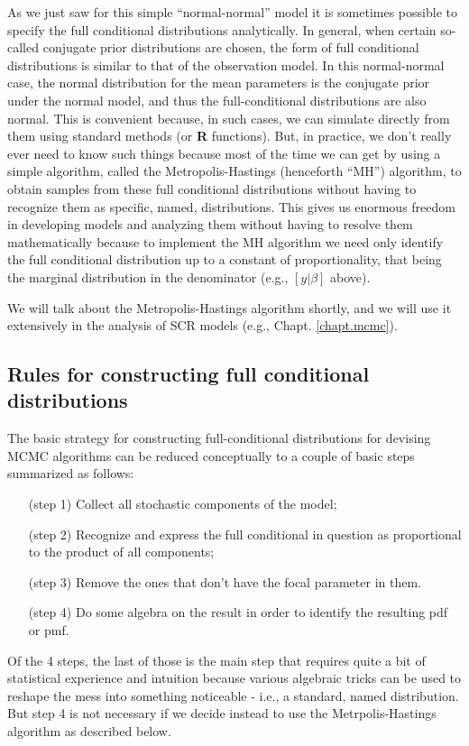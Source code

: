 \vspace{.1in}

As we just saw for this simple ``normal-normal'' model it is sometimes
possible to specify the full conditional distributions
analytically. In general, when certain so-called conjugate prior
distributions are chosen, the form of full conditional distributions
is similar to that of the observation model. In this normal-normal
case, the normal distribution for the mean parameters is the conjugate
prior under the normal model, and thus the full-conditional
distributions are also normal. This is convenient because, in such
cases, we can simulate directly from them using standard methods (or
{\bf R}
functions).  But, in practice, we don't really ever need to know such
things because most of the time we can get by using a simple
algorithm, called the Metropolis-Hastings (henceforth ``MH'')
algorithm, to obtain samples from these full conditional distributions
without having to recognize them as specific, named, distributions.
This gives us enormous freedom in developing models
and analyzing them without having to resolve them mathematically
because to implement the MH algorithm we need only identify the full
conditional distribution up to a constant of proportionality, that
being the marginal distribution in the denominator (e.g., $[y|\beta]$
above).

We will talk about the Metropolis-Hastings algorithm shortly, and we
will use it extensively in the analysis of SCR models (e.g., Chapt.
\ref{chapt.mcmc}).

\subsection{Rules for constructing full conditional distributions}
\label{glms.sec.rules}

The basic strategy for constructing full-conditional distributions for
devising MCMC algorithms can be reduced conceptually to a couple of
basic steps summarized as follows:
\begin{itemize}
\item[   (step 1)] Collect all stochastic components of the model;
\item[   (step 2)] Recognize and express the full conditional in question
  as proportional to the product of all components;
\item[   (step 3)] Remove the ones that don't have the focal parameter in them.
\item[   (step 4)] Do some algebra on the result in order to identify the resulting pdf or pmf.
\end{itemize}
Of the 4 steps, the last of those is the main step that requires quite
a bit of statistical experience and intuition because various
algebraic tricks can be used to reshape the mess into something
noticeable - i.e., a standard, named distribution. But step 4 is not
necessary if we decide instead to use the Metrpolis-Hastings algorithm
as described below.

